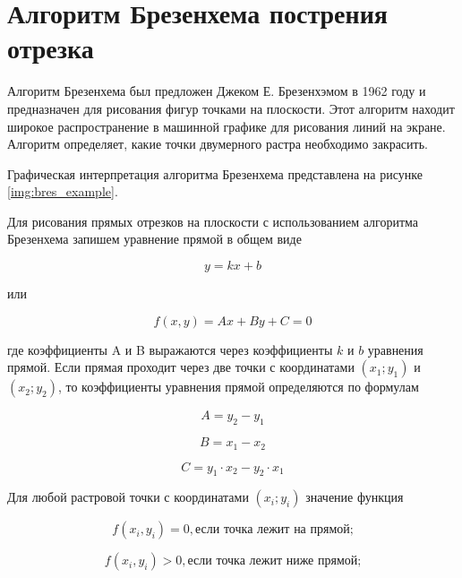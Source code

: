 \section{Алгоритм Брезенхема пострения отрезка}

Алгоритм Брезенхема \cite{bres-alg}  был предложен Джеком Е. Брезенхэмом в 1962 году и предназначен для рисования фигур точками на плоскости. Этот алгоритм находит широкое распространение в машинной графике для рисования линий на экране. Алгоритм определяет, какие точки двумерного растра необходимо закрасить.

Графическая интерпретация алгоритма Брезенхема представлена на рисунке \ref{img:bres_example}.


Для рисования прямых отрезков на плоскости с использованием алгоритма Брезенхема запишем уравнение прямой в общем виде

\begin{equation}
	y=kx+b
\end{equation}

или

\begin{equation}
	f(x,y)=Ax+By+C=0
\end{equation}

где коэффициенты A и B выражаются через коэффициенты $k$ и $b$ уравнения прямой. Если прямая проходит через две точки с координатами $(x_{1};y_{1})$ и $(x_{2};y_{2})$, то коэффициенты уравнения прямой определяются по формулам

\begin{equation}
	A=y_{2}-y_{1}
\end{equation}

\begin{equation}
	B=x_{1}-x_{2}
\end{equation}

\begin{equation}
	C=y_{1} \cdot x_{2}-y_{2} \cdot x_{1}
\end{equation}

Для любой растровой точки с координатами $(x_{i};y_{i})$ значение функция

\begin{equation}
	f(x_{i},y_{i}) = 0, \text{если точка лежит на прямой;}
\end{equation}

\begin{equation}
	f(x_{i},y_{i}) > 0, \text{если точка лежит ниже прямой;}
\end{equation}
	
